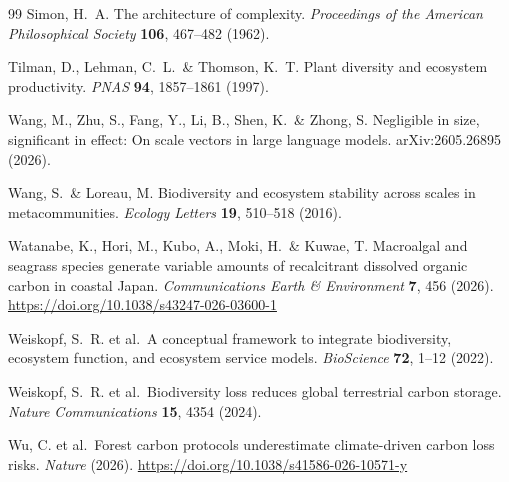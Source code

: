 \documentclass[12pt]{article}
\begin{document}
\begin{thebibliography}{99}
Simon, H.~A. The architecture of complexity. \textit{Proceedings of the American Philosophical Society} \textbf{106}, 467--482 (1962).

Tilman, D., Lehman, C.~L.\ \& Thomson, K.~T. Plant diversity and ecosystem productivity. \textit{PNAS} \textbf{94}, 1857--1861 (1997).

Wang, M., Zhu, S., Fang, Y., Li, B., Shen, K.\ \& Zhong, S.
Negligible in size, significant in effect: On scale vectors in large language models.
arXiv:2605.26895 (2026).

Wang, S.\ \& Loreau, M. Biodiversity and ecosystem stability across scales in metacommunities. \textit{Ecology Letters} \textbf{19}, 510--518 (2016).

Watanabe, K., Hori, M., Kubo, A., Moki, H.\ \& Kuwae, T. Macroalgal and seagrass species generate variable amounts of recalcitrant dissolved organic carbon in coastal Japan. \textit{Communications Earth \& Environment} \textbf{7}, 456 (2026). \url{https://doi.org/10.1038/s43247-026-03600-1}

Weiskopf, S.~R. et al.\ A conceptual framework to integrate biodiversity, ecosystem function, and ecosystem service models. \textit{BioScience} \textbf{72}, 1--12 (2022).

Weiskopf, S.~R. et al.\ Biodiversity loss reduces global terrestrial carbon storage. \textit{Nature Communications} \textbf{15}, 4354 (2024).

Wu, C. et al.\ Forest carbon protocols underestimate climate-driven carbon loss risks. \textit{Nature} (2026). \url{https://doi.org/10.1038/s41586-026-10571-y}

\end{thebibliography}
\end{document}
